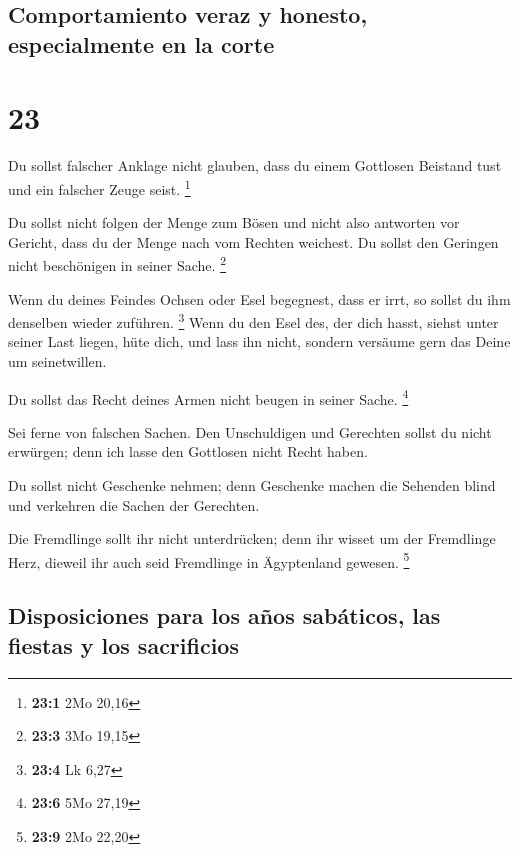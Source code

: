\hypertarget{comportamiento-veraz-y-honesto-especialmente-en-la-corte}{%
\subsection{Comportamiento veraz y honesto, especialmente en la
corte}\label{comportamiento-veraz-y-honesto-especialmente-en-la-corte}}

\hypertarget{section-22}{%
\section{23}\label{section-22}}

 Du sollst falscher Anklage nicht glauben, dass du einem
Gottlosen Beistand tust und ein falscher Zeuge seist. \footnote{\textbf{23:1}
  2Mo 20,16}

 Du sollst nicht folgen der Menge zum Bösen und nicht also
antworten vor Gericht, dass du der Menge nach vom Rechten weichest.
 Du sollst den Geringen nicht beschönigen in seiner Sache.
\footnote{\textbf{23:3} 3Mo 19,15}

 Wenn du deines Feindes Ochsen oder Esel begegnest, dass
er irrt, so sollst du ihm denselben wieder zuführen. \footnote{\textbf{23:4}
  Lk 6,27}  Wenn du den Esel des, der dich hasst, siehst
unter seiner Last liegen, hüte dich, und lass ihn nicht, sondern
versäume gern das Deine um seinetwillen.

 Du sollst das Recht deines Armen nicht beugen in seiner
Sache. \footnote{\textbf{23:6} 5Mo 27,19}

 Sei ferne von falschen Sachen. Den Unschuldigen und
Gerechten sollst du nicht erwürgen; denn ich lasse den Gottlosen nicht
Recht haben.

 Du sollst nicht Geschenke nehmen; denn Geschenke machen
die Sehenden blind und verkehren die Sachen der Gerechten.

 Die Fremdlinge sollt ihr nicht unterdrücken; denn ihr
wisset um der Fremdlinge Herz, dieweil ihr auch seid Fremdlinge in
Ägyptenland gewesen. \footnote{\textbf{23:9} 2Mo 22,20}

\hypertarget{disposiciones-para-los-auxf1os-sabuxe1ticos-las-fiestas-y-los-sacrificios}{%
\subsection{Disposiciones para los años sabáticos, las fiestas y los
sacrificios}\label{disposiciones-para-los-auxf1os-sabuxe1ticos-las-fiestas-y-los-sacrificios}}

